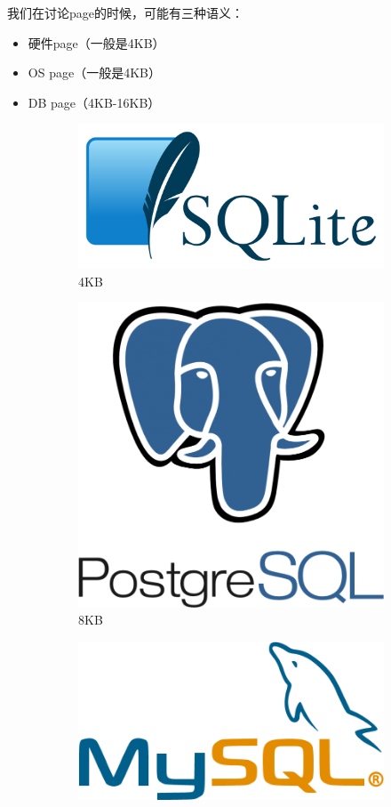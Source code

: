 \documentclass[aspectratio=169, 14pt]{beamer}
\begin{document}
\begin{frame}[fragile]
我们在讨论\alert{page}的时候，可能有三种语义：

\begin{itemize}
    \item 硬件page（一般是4KB）
    \item OS page（一般是4KB）
    \item DB page（4KB-16KB）
\end{itemize}
\pause
\noindent\makebox[\linewidth]{\rule{\paperwidth}{0.4pt}}
\begin{figure}
    \centering
    \begin{subfigure}[b]{0.3\textwidth}
        \centering
        \includegraphics[width=\textwidth]{image/sqlite}
        \caption{4KB}
    \end{subfigure}
    \hfill
    \begin{subfigure}[b]{0.3\textwidth}
        \centering
        \includegraphics[width=.6\textwidth]{image/pg}
        \caption{8KB}
    \end{subfigure}
    \hfill
    \begin{subfigure}[b]{0.3\textwidth}
        \centering
        \includegraphics[width=\textwidth]{image/mysql}

\end{subfigure}
\end{figure}
\end{frame}
\end{document}
